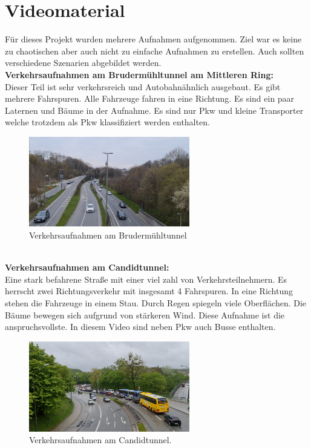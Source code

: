 \documentclass[conference]{IEEEtran}
\begin{document}
	\section{Videomaterial}
	Für dieses Projekt wurden mehrere Aufnahmen aufgenommen. Ziel war es keine zu chaotischen aber auch nicht zu einfache Aufnahmen zu erstellen. Auch sollten verschiedene Szenarien abgebildet werden.\\
	\textbf{Verkehrsaufnahmen am Brudermühltunnel am Mittleren Ring:}\\
	Dieser Teil ist sehr verkehrsreich und Autobahnähnlich ausgebaut. Es gibt mehrere Fahrspuren. Alle Fahrzeuge fahren in eine Richtung. Es sind ein paar Laternen und Bäume in der Aufnahme. Es sind nur Pkw und kleine Transporter welche trotzdem als Pkw klassifiziert werden enthalten.
	\begin{figure}[!h]
		\begin{center}
			\includegraphics[width=7cm]{Media/BrudermuhlRaw.png}
			\caption{Verkehrsaufnahmen am Brudermühltunnel}
			\label{BrudermuhlRaw}
		\end{center}
	\end{figure}\\
	\textbf{Verkehrsaufnahmen am Candidtunnel:}\\
	Eine stark befahrene Straße mit einer viel zahl von Verkehrsteilnehmern. Es herrscht zwei Richtungsverkehr mit insgesamt 4 Fahrspuren. In eine Richtung stehen die Fahrzeuge in einem Stau. Durch Regen spiegeln viele Oberflächen. Die Bäume bewegen sich aufgrund von stärkeren Wind. Diese Aufnahme ist die anspruchsvollste. In diesem Video sind neben Pkw auch Busse enthalten.
	\begin{figure}[!h]
		\begin{center}
			\includegraphics[width=7cm]{Media/CandidRaw.png}
			\caption{Verkehrsaufnahmen am Candidtunnel.}
			\label{BrudermuhlRaw}
		\end{center}
	\end{figure}\\
\end{document}
